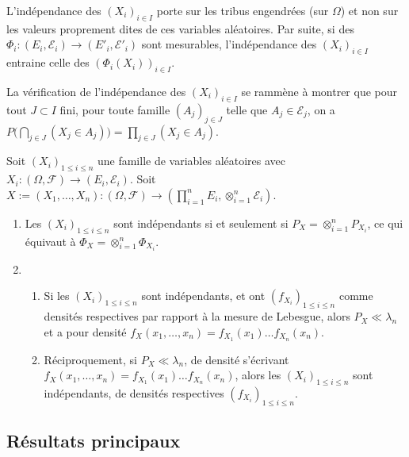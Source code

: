 \documentclass[11pt,a4paper]{article}
\begin{document}
\begin{rmq}
L'indépendance des $(X_i)_{i\in I}$ porte sur les tribus engendrées (sur $\Omega$) et non sur les
valeurs proprement dites de ces variables aléatoires. Par suite, si des $\Phi_i : (E_i,\mathcal{E}_i) \to (E'_i,\mathcal{E}'_i)$ sont mesurables, l'indépendance des $(X_i)_{i\in I}$ entraine celle des $(\Phi_i(X_i))_{i\in I}$.
\end{rmq}

\begin{rmq}
La vérification de l'indépendance des $(X_i)_{i\in I}$ se rammène à montrer que pour tout $J\subset I$ fini, pour toute famille $(A_j)_{j\in J}$ telle que $A_j\in \mathcal{E}_j$, on a $\displaystyle P\Big(\bigcap_{j\in J}(X_j\in A_j )\Big)=\prod_{j\in J}(X_j \in A_j)$.
\end{rmq}

\begin{propstar}
 Soit $(X_i)_{ 1 \leq i \leq n}$ une famille de variables aléatoires avec $X_i : (\Omega,\mathcal{F}) \to (E_i,\mathcal{E}_i)$. Soit $X:=(X_1,\dots,X_n) : (\Omega,\mathcal{F}) \to (\prod_{i=1}^nE_i, \otimes_{i=1}^n \mathcal{E}_i)$. 
\begin{enumerate}
\item Les  $(X_i)_{ 1 \leq i \leq n}$ sont indépendants si et seulement si $P_X=\otimes_{i=1}^n P_{X_i}$, ce qui équivaut à $\Phi_X=\otimes_{i=1}^n \Phi_{X_i}$.
\item 
\begin{enumerate}
\item Si les $(X_i)_{ 1 \leq i \leq n}$ sont indépendants, et ont $(f_{X_i})_{1\leq i \leq n}$ comme densités respectives par rapport à la mesure de Lebesgue, alors $P_X \ll \lambda_n$ et a pour densité $f_X(x_1,\dots,x_n)=f_{X_1}(x_1)\dots f_{X_n}(x_n)$.
\item Réciproquement, si $P_X \ll \lambda_n$, de densité s'écrivant $f_X(x_1,\dots,x_n)=f_{X_1}(x_1)\dots f_{X_n}(x_n)$, alors les $(X_i)_{ 1 \leq i \leq n}$ sont indépendants, de densités respectives $(f_{X_i})_{1\leq i \leq n}$.
\end{enumerate}
\end{enumerate}
\end{propstar}




\subsection*{Résultats principaux}
\end{document}
